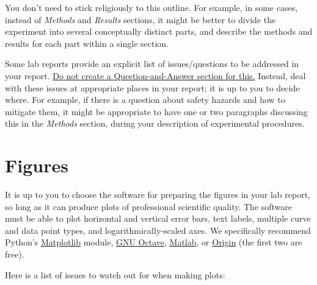 \documentclass[11pt,a4paper]{article}
\begin{document}
\noindent
You don't need to stick religiously to this outline.  For example, in
some cases, instead of \textit{Methods} and \textit{Results} sections,
it might be better to divide the experiment into several conceptually
distinct parts, and describe the methods and results for each part
within a single section.

Some lab reports provide an explicit list of issues/questions to be
addressed in your report.  \underline{Do not create a
  Question-and-Answer section for this.}  Instead, deal with these
issues at appropriate places in your report; it is up to you to decide
where.  For example, if there is a question about safety hazards and
how to mitigate them, it might be appropriate to have one or two
paragraphs discussing this in the \textit{Methods} section, during
your description of experimental procedures.

\section{Figures}

It is up to you to choose the software for preparing the figures in
your lab report, so long as it can produce plots of professional
scientific quality.  The software must be able to plot horizontal and
vertical error bars, text labels, multiple curve and data point types,
and logarithmically-scaled axes.  We specifically recommend Python's
\href{https://matplotlib.org/}{Matplotlib} module,
\href{https://www.gnu.org/software/octave/}{GNU Octave},
\href{https://www.mathworks.com/products/matlab.html}{Matlab}, or
\href{https://www.originlab.com/}{Origin} (the first two are free).

Here is a list of issues to watch out for when making plots:
\end{document}
